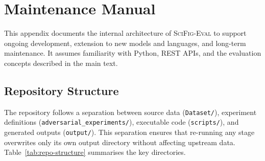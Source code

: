 \chapter{Maintenance Manual}
\label{app:maintenance-manual}

\small
This appendix documents the internal architecture of \textsc{SciFig-Eval} to support ongoing development, extension to new models and languages, and long-term maintenance. It assumes familiarity with Python, REST APIs, and the evaluation concepts described in the main text.

\section{Repository Structure}

The repository follows a separation between source data (\texttt{Dataset/}), experiment definitions (\texttt{adversarial\_experiments/}), executable code (\texttt{scripts/}), and generated outputs (\texttt{output/}). This separation ensures that re-running any stage overwrites only its own output directory without affecting upstream data. Table~\ref{tab:repo-structure} summarises the key directories.

